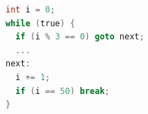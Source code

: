 \documentclass[tikz]{standalone}
\begin{document}
\begin{lrbox}{\exCode}
\begin{lstlisting}[language=C,style=smaller]
int i = 0;
while (true) {
  if (i % 3 == 0) goto next;
  ...
next:
  i += 1;
  if (i == 50) break;
}
\end{lstlisting}
\end{lrbox}


\end{document}

